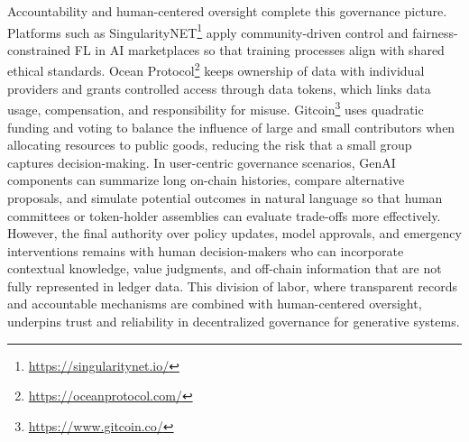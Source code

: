 \documentclass[5p,twocolumn]{elsarticle}
\begin{document}
Accountability and human-centered oversight complete this governance picture. Platforms such as SingularityNET\footnote{\url{https://singularitynet.io/}} apply community-driven control and fairness-constrained FL in AI marketplaces so that training processes align with shared ethical standards. Ocean Protocol\footnote{\url{https://oceanprotocol.com/}} keeps ownership of data with individual providers and grants controlled access through data tokens, which links data usage, compensation, and responsibility for misuse. Gitcoin\footnote{\url{https://www.gitcoin.co/}} uses quadratic funding and voting to balance the influence of large and small contributors when allocating resources to public goods, reducing the risk that a small group captures decision-making. In user-centric governance scenarios, GenAI components can summarize long on-chain histories, compare alternative proposals, and simulate potential outcomes in natural language so that human committees or token-holder assemblies can evaluate trade-offs more effectively. However, the final authority over policy updates, model approvals, and emergency interventions remains with human decision-makers who can incorporate contextual knowledge, value judgments, and off-chain information that are not fully represented in ledger data. This division of labor, where transparent records and accountable mechanisms are combined with human-centered oversight, underpins trust and reliability in decentralized governance for generative systems.
\end{document}
